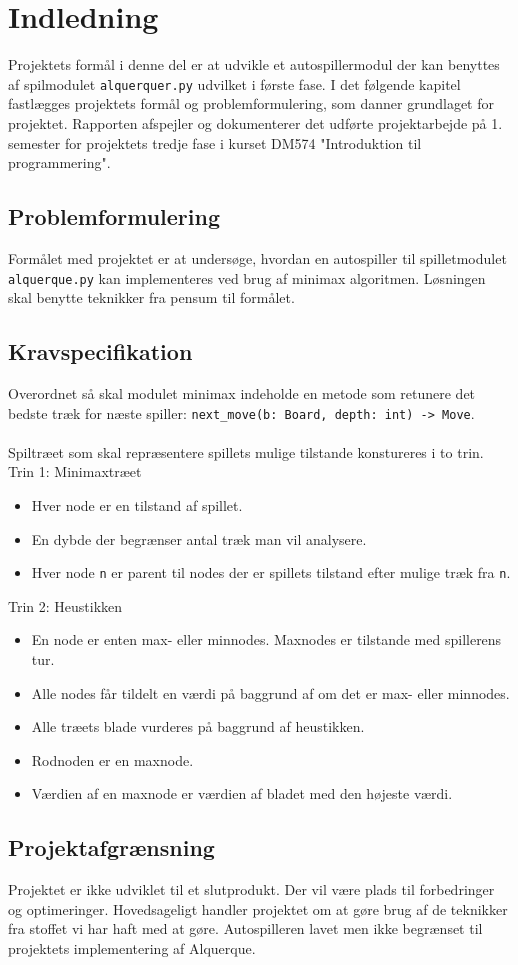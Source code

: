 \section{Indledning}
Projektets formål i denne del er at udvikle et autospillermodul der kan benyttes af spilmodulet \texttt{alquerquer.py} 
udvilket i første fase. I det følgende kapitel fastlægges projektets formål og problemformulering,
som danner grundlaget for projektet. Rapporten afspejler og dokumenterer det udførte projektarbejde på 1. semester for 
projektets tredje fase i kurset DM574 "Introduktion til programmering".

\subsection{Problemformulering}
Formålet med projektet er at undersøge, hvordan en autospiller til spilletmodulet \texttt{alquerque.py} kan implementeres
ved brug af minimax algoritmen. Løsningen skal benytte teknikker fra pensum til formålet.

\subsection{Kravspecifikation}
Overordnet så skal modulet minimax indeholde en metode som retunere det bedste træk for næste spiller: 
\texttt{next\_move(b: Board, depth: int) -> Move}. \\
\\
Spiltræet som skal repræsentere spillets mulige tilstande konstureres i to trin.
\bigbreak
Trin 1: Minimaxtræet
\begin{itemize}
    \item Hver node er en tilstand af spillet.
    \item En dybde der begrænser antal træk man vil analysere.
    \item Hver node \texttt{n} er parent til nodes der er spillets tilstand efter mulige træk fra \texttt{n}.
\end{itemize}
\bigbreak
Trin 2: Heustikken
\begin{itemize}
    \item En node er enten max- eller minnodes. Maxnodes er tilstande med spillerens tur.
    \item Alle nodes får tildelt en værdi på baggrund af om det er max- eller minnodes.
    \item Alle træets blade vurderes på baggrund af heustikken.
    \item Rodnoden er en maxnode.
    \item Værdien af en maxnode er værdien af bladet med den højeste værdi.
\end{itemize}

\subsection{Projektafgrænsning}
Projektet er ikke udviklet til et slutprodukt. Der vil være plads til forbedringer og optimeringer.
Hovedsageligt handler projektet om at gøre brug af de teknikker fra stoffet vi har haft med at gøre.
Autospilleren lavet men ikke begrænset til projektets implementering af Alquerque.